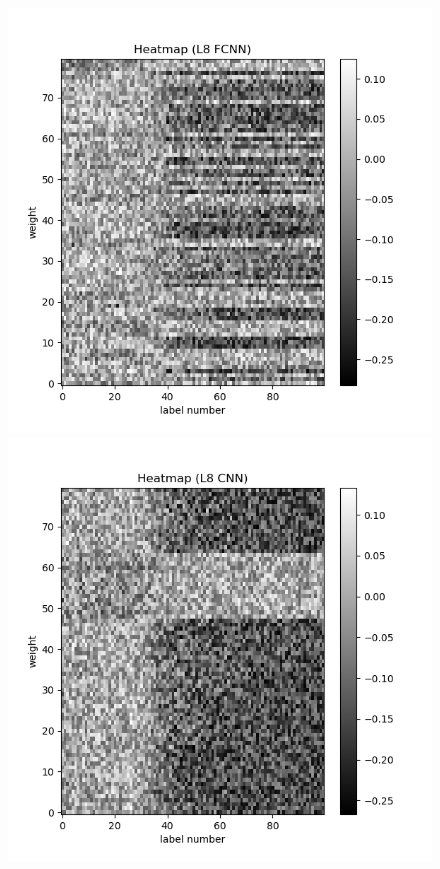 \documentclass[a4paper,11pt]{jsreport}
\begin{document}
\begin{figure}[H]
  \begin{minipage}[b]{0.45\linewidth}
    \begin{center}
      \includegraphics[keepaspectratio, scale=0.45]{image/L8_FCNN_weight.png}
    \end{center}
  \end{minipage}
  \begin{minipage}[b]{0.45\linewidth}
    \begin{center}
      \includegraphics[keepaspectratio, scale=0.45]{image/L8_CNN_weight.png}

\end{center}
\end{minipage}
\end{figure}
\end{document}
